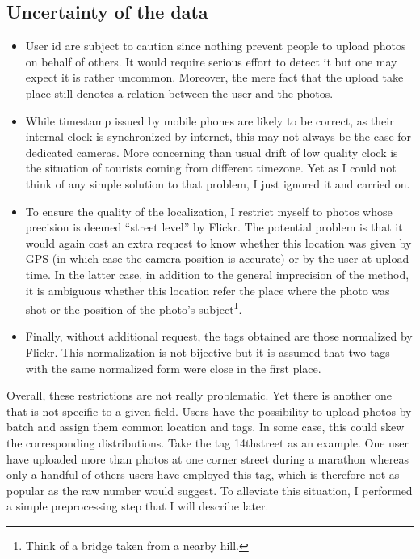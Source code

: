 \subsection{Uncertainty of the data}
\label{p:data}
\begin{itemize}
	\item User id are subject to caution since nothing prevent people to
 upload photos on behalf of others. It would require serious effort to
 detect it but one may expect it is rather uncommon. Moreover, the mere
 fact that the upload take place still denotes a relation between the
 user and the photos.
	\item While timestamp issued by mobile phones are likely to be correct,
 as their internal clock is synchronized by internet, this may not
 always be the case for dedicated cameras. More concerning than usual
 drift of low quality clock is the situation of tourists coming from
 different timezone. Yet as I could not think of any simple solution to
 that problem, I just ignored it and carried on.
	\item To ensure the quality of the localization, I restrict myself to
 photos whose precision is deemed \enquote{street level} by Flickr. The
 potential problem is that it would again cost an extra request to know
 whether this location was given by GPS (in which case the camera
 position is accurate) or by the user at upload time. In the latter
 case, in addition to the general imprecision of the method, it is
 ambiguous whether this location refer the place where the photo was
 shot or the position of the photo's subject\footnote{Think of a bridge
 taken from a nearby hill.}.
	\item Finally, without additional request, the tags obtained are those
 normalized by Flickr. This normalization is not bijective but it is
 assumed that two tags with the same normalized form were close in the
 first place.
\end{itemize}

Overall, these restrictions are not really problematic. Yet there is another
one that is not specific to a given field. Users have the possibility to
upload photos by batch and assign them common location and tags. In some case,
this could skew the corresponding distributions. Take the tag
\textsf{14thstreet} as an example. One user have uploaded more than
 photos at one corner street during a marathon whereas only a
handful of others users have employed this tag, which is therefore not as
popular as the raw number would suggest. To alleviate this situation, I
performed a simple preprocessing step that I will describe later.

